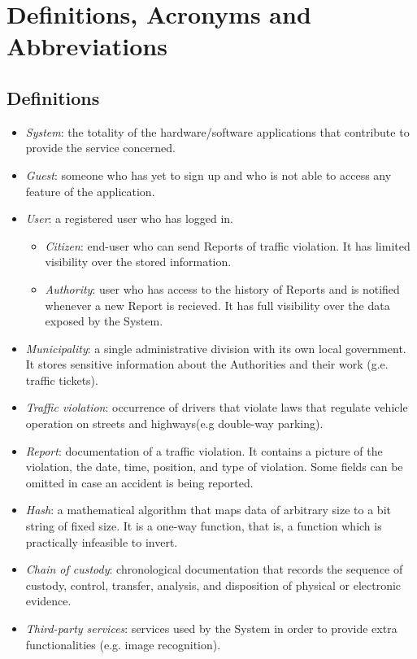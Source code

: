 \documentclass{report}
\begin{document}
\section{Definitions, Acronyms and Abbreviations}
\subsection{Definitions}
\begin{itemize}
	\item \textit{System}: the totality of the hardware/software applications that contribute to provide the service concerned.
    \item \textit{Guest}: someone who has yet to sign up and who is not able to access any feature of the application.
    \item \textit{User}: a registered user who has logged in.
	\begin{itemize}
		\item \textit{Citizen}: end-user who can send Reports of traffic violation. It has limited visibility over the stored information.
		\item \textit{Authority}: user who has access to the history of Reports and is notified whenever a new Report is recieved. It has full visibility over the data exposed by the System.
	\end{itemize} 
	\item \textit{Municipality}: a single administrative division with its own local government. It stores sensitive information about the Authorities and their work (g.e. traffic tickets).
    \item \textit{Traffic violation}: occurrence of drivers that violate laws that regulate vehicle operation on streets and highways(e.g double-way parking).
    \item \textit{Report}: documentation of a traffic violation. It contains a picture of the violation, the date, time, position, and type of violation. Some fields can be omitted in case an accident is being reported.
    \item \textit{Hash}: a mathematical algorithm that maps data of arbitrary size to a bit string of fixed size. It is a one-way function, that is, a function which is practically infeasible to invert.
    \item \textit{Chain of custody}: chronological documentation that records the sequence of custody, control, transfer, analysis, and disposition of physical or electronic evidence.
    \item \textit{Third-party services}: services used by the System in order to provide extra functionalities (e.g. image recognition).
\end{itemize}
\end{document}

